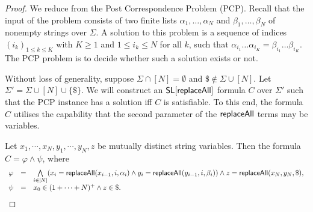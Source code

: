 \begin{proof}
	We reduce from the Post Correspondence Problem (PCP). Recall that the input of the problem consists of two finite lists $\alpha_{1},\ldots ,\alpha_{N}$ and $\beta_1,\ldots ,\beta_N$ of nonempty strings over $\Sigma$. A solution to this problem is a sequence of indices $(i_{k})_{1\leq k\leq K}$ with $ K\geq 1$ and $ 1\leq i_{k}\leq N$ for all $k$, such that
	$	\alpha _{{i_{1}}}\ldots \alpha _{{i_{K}}}=\beta _{{i_{1}}}\ldots \beta _{{i_{K}}}.
	$
	The PCP problem is to decide whether such a solution exists or not.
	
	Without loss of generality, suppose $\Sigma \cap [N] = \emptyset$ and $\$ \not \in \Sigma \cup [N]$. Let $\Sigma' = \Sigma \cup [N] \cup \{\$\}$. We will construct an $\mathsf{SL}[\mathsf{replaceAll}]$ formula $C$ over $\Sigma'$ such that the PCP instance has a solution iff $C$ is satisfiable. To this end, the formula $C$ utilises the capability that the second parameter of the $\mathsf{replaceAll}$ terms may be variables.
	
	Let $x_1, \cdots, x_N, y_1, \cdots, y_N, z$ be mutually distinct string variables. Then the formula $C = \varphi \wedge \psi$, where 
	$$
	\begin{array}{l c l}
	\varphi & = & \bigwedge \limits_{i \in [N]} (x_i = \mathsf{replaceAll}(x_{i-1}, i, \alpha_i) \wedge y_i = \mathsf{replaceAll}(y_{i-1}, i, \beta_i)) \wedge  z = \mathsf{replaceAll}(x_N, y_N, \$), \\
	\psi & = & x_0 \in (1 + \cdots + N)^+ \wedge z \in \$.
	\end{array}
	$$
	

\end{proof}
